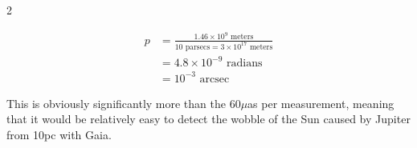 \documentclass[12pt]{article}
\newenvironment{answer}[2][Answer]{\begin{trivlist}
\item[\hskip \labelsep {\bfseries #1}\hskip \labelsep {\bfseries #2.}]}{\end{trivlist}}
\begin{document}
\begin{multicols*}{2}
\begin{answer}{6}
\begin{align*}
  p &= \frac{1.46\times 10^9 \text{ meters}}{10 \text{ parsecs} = 3\times 10^{17} \text{ meters}} \\
  &= 4.8 \times 10^{-9} \text{ radians} \\
  &= 10^{-3} \text{ arcsec}
\end{align*}

This is obviously significantly more than the 60$\mu$as per measurement, meaning that it would be relatively easy to detect the wobble of the Sun caused by Jupiter from 10pc with Gaia.



\end{answer}
\end{multicols*}
\vfill\eject
\clearpage



\end{document}

